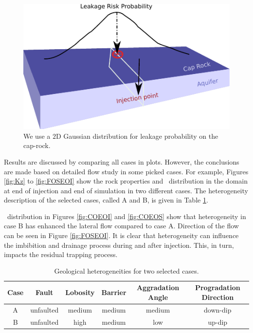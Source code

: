 \begin{figure}
  \centering
  \includegraphics[width=0.65 \linewidth]{./figurer/LR_2} 
  \caption{We use a $2\mbox{D}$ Gaussian distribution for leakage probability
on the cap-rock.}
  \label{fig:SLR}
%
\end{figure}

Results are discussed by comparing all cases in plots. However, the conclusions are made based on detailed flow study in some picked cases. For example, Figures \ref{fig:Kz} to \ref{fig:FOSEOI} show the rock properties and \coo\ distribution in the domain at end of injection and end of simulation in two different cases. The heterogeneity description of the selected cases, called A and B, is given in Table \ref{tab:AaB}.

\coo\ distribution in Figures \ref{fig:COEOI} and \ref{fig:COEOS} show that heterogeneity in case B has enhanced the lateral flow compared to case A. Direction of the flow can be seen in Figure \ref{fig:FOSEOI}. It is clear that heterogeneity can influence the imbibition and drainage process during and after injection. This, in turn, impacts the residual trapping process.

\begin{table}
\center
\caption{Geological heterogeneities for two selected cases.}
\begin{tabular}{|c|c|c|c|c|c|}
\hline
Case & Fault&Lobosity&Barrier&Aggradation Angle&Progradation Direction\\
\hline
A&unfaulted&medium&medium&medium&down-dip\\
\hline
B&unfaulted&high&medium&low&up-dip\\
\hline
\end{tabular}
\label{tab:AaB}
\end{table}

